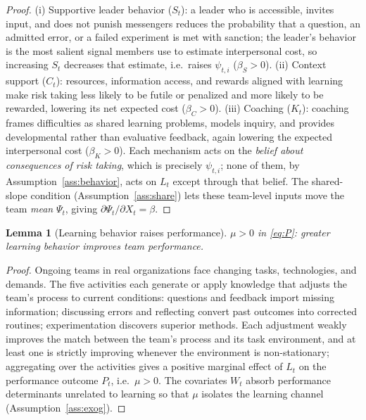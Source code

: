 \documentclass{amsart}
\newtheorem{lemma}{Lemma}
\theoremstyle{definition}
\theoremstyle{remark}
\begin{document}
\begin{proof}
(i) Supportive leader behavior ($S_t$): a leader who is accessible,
invites input, and does not punish messengers reduces the probability that
a question, an admitted error, or a failed experiment is met with
sanction; the leader's behavior is the most salient signal members use to
estimate interpersonal cost, so increasing $S_t$ decreases that estimate,
i.e.\ raises $\psi_{t,i}$ ($\beta_S>0$). (ii) Context support ($C_t$):
resources, information access, and rewards aligned with learning make risk
taking less likely to be futile or penalized and more likely to be
rewarded, lowering its net expected cost ($\beta_C>0$). (iii) Coaching
($K_t$): coaching frames difficulties as shared learning problems, models
inquiry, and provides developmental rather than evaluative feedback, again
lowering the expected interpersonal cost ($\beta_K>0$). Each mechanism acts
on the \emph{belief about consequences of risk taking}, which is precisely
$\psi_{t,i}$; none of them, by Assumption~\ref{ass:behavior}, acts on
$L_t$ except through that belief. The shared-slope condition
(Assumption~\ref{ass:share}) lets these team-level inputs move the team
\emph{mean} $\Psi_t$, giving $\partial \Psi_t/\partial X_t=\beta$.
\end{proof}

\begin{lemma}[Learning behavior raises performance]\label{lem:perf}
$\mu>0$ in \eqref{eq:P}: greater learning behavior improves team
performance.
\end{lemma}

\begin{proof}
Ongoing teams in real organizations face changing tasks, technologies, and
demands. The five activities each generate or apply knowledge that adjusts
the team's process to current conditions: questions and feedback import
missing information; discussing errors and reflecting convert past
outcomes into corrected routines; experimentation discovers superior
methods. Each adjustment weakly improves the match between the team's
process and its task environment, and at least one is strictly improving
whenever the environment is non-stationary; aggregating over the
activities gives a positive marginal effect of $L_t$ on the performance
outcome $P_t$, i.e.\ $\mu>0$. The covariates $W_t$ absorb performance
determinants unrelated to learning so that $\mu$ isolates the
learning channel (Assumption~\ref{ass:exog}).
\end{proof}
\end{document}
